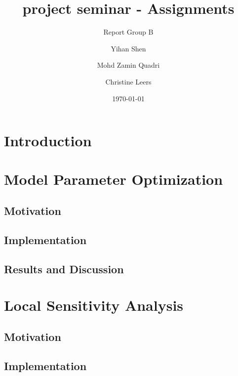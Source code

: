 \documentclass[12pt]{scrartcl}
\title{\vspace{3cm} project seminar - Assignments} %
\subtitle{\vspace{0.5cm} Report \vspace{0.5cm} Group B}  %
\date{\today{}}
\author[1]{Yihan Shen} %
\author[2]{Mohd Zamin Quadri} %
\author[3]{Christine Leers} %
\affil[1]{yihan.shen@tum.de}
\affil[2]{zamin.quadri@tum.de}
\affil[3]{ge79pok@mytum.de}
\begin{document}
\maketitle\thispagestyle{titlepage}

\newpage

\tableofcontents

\newpage

\printacronyms
\listoffigures
\listoftables
\newpage







\section{Introduction} 
    
\newpage

\section{Model Parameter Optimization}
    \subsection{Motivation}
        
    \subsection{Implementation}
        
    \subsection{Results and Discussion}
        
\newpage

\section{Local Sensitivity Analysis}
    \subsection{Motivation}
        
    \subsection{Implementation}
        
\end{document}
